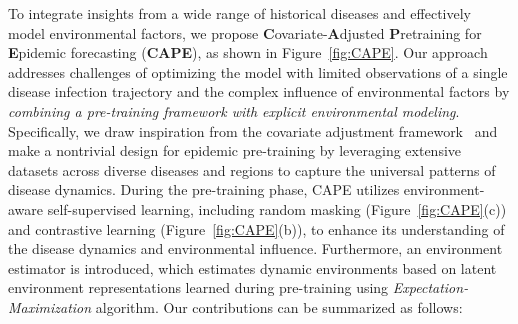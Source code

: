 To integrate insights from a wide range of historical diseases and effectively model environmental factors, we propose \textbf{C}ovariate-\textbf{A}djusted \textbf{P}retraining for \textbf{E}pidemic forecasting (\textbf{CAPE}), as shown in Figure~\ref{fig:CAPE}. Our approach addresses challenges of optimizing the model with limited observations of a single disease infection trajectory and the complex influence of environmental factors by \textit{combining a pre-training framework with explicit environmental modeling}. Specifically, we draw inspiration from the covariate adjustment framework~\cite{runge2023causal} and make a nontrivial design for epidemic pre-training by leveraging extensive datasets across diverse diseases and regions to capture the universal patterns of disease dynamics. During the pre-training phase, CAPE utilizes environment-aware self-supervised learning, including random masking (Figure~\ref{fig:CAPE}(c)) and contrastive learning (Figure~\ref{fig:CAPE}(b)), to enhance its understanding of the disease dynamics and environmental influence. Furthermore, an environment estimator is introduced, which estimates dynamic environments based on latent environment representations learned during pre-training using \textit{Expectation-Maximization} algorithm. Our contributions can be summarized as follows:


